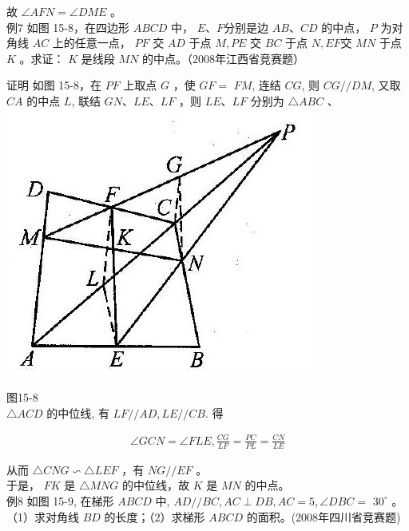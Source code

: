 \documentclass[10pt]{article}
\begin{document}
故 $\angle A F N=\angle D M E$ 。\\
例7 如图 15-8，在四边形 $A B C D$ 中， $E 、 F$分别是边 $A B 、 C D$ 的中点， $P$ 为对角线 $A C$ 上的任意一点， $P F$ 交 $A D$ 于点 $M, P E$ 交 $B C$ 于点 $N, E F$交 $M N$ 于点 $K$ 。求证： $K$ 是线段 $M N$ 的中点。（2008年江西省竞赛题）

证明 如图 15-8，在 $P F$ 上取点 $G$ ，使 $G F=$ $F M$, 连结 $C G$, 则 $C G / / D M$, 又取 $C A$ 的中点 $L$, 联结 $G N 、 L E 、 L F$ ，则 $L E 、 L F$ 分别为 $\triangle A B C$ 、\\
\includegraphics[max width=\textwidth, center]{2024_10_30_2c8f45efd4a519b08e1ag-140(1)}

图15-8\\
$\triangle A C D$ 的中位线, 有 $L F / / A D, L E / / C B$. 得

\begin{align*}
\angle G C N=\angle F L E, \frac{C G}{L F}=\frac{P C}{P L}=\frac{C N}{L E}
\end{align*}

从而 $\triangle C N G \backsim \triangle L E F$ ，有 $N G / / E F$ 。\\
于是， $F K$ 是 $\triangle M N G$ 的中位线，故 $K$ 是 $M N$ 的中点。\\
例8 如图 15-9, 在梯形 $A B C D$ 中, $A D / / B C, A C \perp D B, A C=5, \angle D B C=$ $30^{\circ}$ 。（1）求对角线 $B D$ 的长度；（2）求梯形 $A B C D$ 的面积。(2008年四川省竞赛题)
\end{document}
